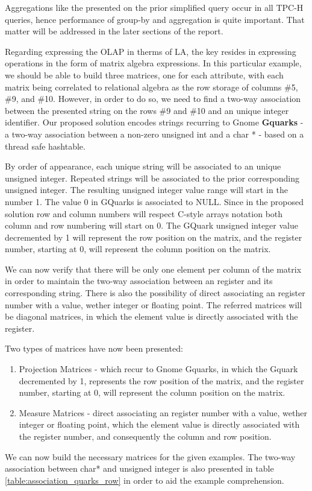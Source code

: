 Aggregations like the presented on the prior simplified query occur in all TPC-H queries, hence performance of group-by and aggregation is quite important. That matter will be addressed in the later sections of the report.\par 
Regarding expressing the OLAP  in therms of LA, the key resides in expressing operations in the form of matrix algebra expressions.  In this particular example, we should be able to build three matrices, one for each attribute, with each matrix being correlated to relational algebra as the row storage of columns \#5, \#9, and \#10. However, in order to do so, we need to find a two-way association between the presented string on the rows \#9 and \#10 and an unique integer identifier. Our proposed solution encodes strings recurring to Gnome \textbf{Gquarks} \cite{gquarks} - a two-way association between a non-zero unsigned int and a char * - based on a thread safe hashtable. \par 
By order of appearance, each unique string will be associated to an unique unsigned integer. Repeated strings will be associated to the prior corresponding unsigned integer. The resulting unsigned integer value range will start in the number 1. The value 0 in GQuarks is associated to NULL. Since in the proposed solution row and column numbers will respect  C-style arrays notation both column and row numbering will start on 0. The GQuark unsigned integer value decremented by 1  will represent the row position on the matrix, and the register number, starting at 0, will represent the column position on the matrix. \par 
We can now verify that there will be only one element per column of the matrix in order to maintain the two-way association between an register and its corresponding string. There is also the possibility of direct associating an register number with a value, wether integer or floating point. The referred matrices will be diagonal matrices, in which the element value is directly associated with the register.\par 
Two types of matrices have now been presented:
\begin{enumerate}
\item Projection Matrices - which recur to Gnome Gquarks, in which the Gquark decremented by 1, represents the row position of the matrix, and the register number, starting at 0, will represent the column position on the matrix.
\item Measure Matrices -  direct associating an register number with a value, wether integer or floating point,  which the element value is directly associated with the register number, and consequently the column and row position.
\end{enumerate}
 
We can now build the necessary matrices for the given examples. The two-way association between char* and unsigned integer is also presented in table \ref{table:association_quarks_row} in order to aid the example comprehension. 






